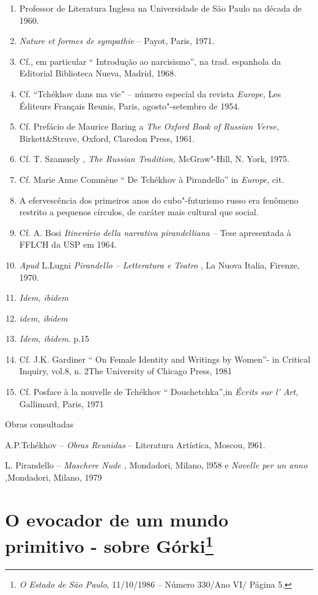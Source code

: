 \begin{enumerate}
\def\labelenumi{\arabic{enumi}.}
\item
  Professor de Literatura Inglesa na Universidade de São Paulo na década
  de 1960.
\item
  \emph{Nature et formes de sympathie} -- Payot, Paris, 1971.
\item
  Cf., em particular `` Introdução ao narcisismo'', na trad. espanhola
  da Editorial Biblioteca Nueva, Madrid, 1968.
\item
  Cf. ``Tchékhov dans ma vie'' -- número especial da revista
  \emph{Europe,} Les Éditeurs Français Reunis, Paris, agosto"-setembro de
  1954.
\item
  Cf. Prefácio de Maurice Baring a \emph{The Oxford Book of Russian
  Verse,} Birkett\&Struve, Oxford, Claredon Press, 1961.
\item
  Cf. T. Szamuely , \emph{The Russian Tradition,} McGraw"-Hill, N. York,
  1975.
\item
  Cf. Marie Anne Commène `` De Tchékhov à Pirandello'' in \emph{Europe},
  cit.
\item
  A efervescência dos primeiros anos do cubo"-futurismo russo era
  fenômeno restrito a pequenos círculos, de caráter mais cultural que
  social.
\item
  Cf. A. Bosi \emph{Itinerário della narrativa pirandelliana --} Tese
  apresentada à FFLCH da USP em 1964.
\item
  \emph{Apud} L.Lugni \emph{Pirandello -- Letteratura e Teatro} , La
  Nuova Italia, Firenze, 1970.
\item
  \emph{Idem, ibidem}
\item
  \emph{idem, ibidem}
\item
  \emph{Idem, ibidem}. p.15
\item
  Cf. J.K. Gardiner `` On Female Identity and Writings by Women''- in
  Critical Inquiry, vol.8, n. 2The \textbar{}University of Chicago
  Press, 1981
\item
  Cf. Posface à la nouvelle de Tchékhov `` Douchetchka'',in \emph{Écrits
  sur l' Art,} Gallimard, Paris, 1971
\end{enumerate}

Obras consultadas

A.P.Tchékhov -- \emph{Obras Reunidas} -- Literatura Artística, Moscou,
l961.

L. Pirandello -- \emph{Maschere Nude ,} Mondadori, Milano, l958 e
\emph{Novelle per un anno ,}Mondadori, Milano, 1979

\chapter{O evocador de um mundo primitivo - sobre Górki\footnote{\emph{O
  Estado de São Paulo}, 11/10/1986 -- Número 330/Ano VI/ Página 5.}}

